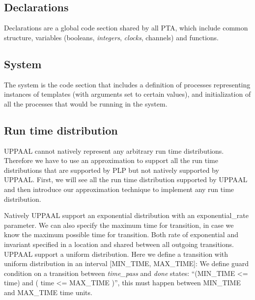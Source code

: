 \subsection{Declarations}
Declarations are a global code section shared by all PTA, which include common structure, variables (booleans, \textit{integers}, \textit{clocks}, channels) and functions.\\
\subsection{System}
The system is the code section that includes a definition of processes representing instances of templates (with arguments set to certain values), and initialization of all the processes that would be running in the system.\\
\subsection{Run time distribution}
UPPAAL cannot natively represent any arbitrary run time distributions. Therefore we have to use an approximation to support all the run time distributions that are supported by PLP but not natively supported by UPPAAL. First, we will see all the run time distribution supported by UPPAAL and then introduce our approximation technique to implement any run time distribution. 
\par Natively UPPAAL support an exponential distribution with an exponential_rate parameter. We can also specify the maximum time for transition, in case we know the maximum possible time for transition. Both rate of exponential and invariant specified in a location and shared between all outgoing transitions.  UPPAAL support a uniform distribution. Here we define a transition with uniform distribution in an interval \small[MIN_TIME, MAX_TIME\small]:  We define guard condition on a transition between \textcolor{ColorUppaalState}{\textit{time_pass}} and \textcolor{ColorUppaalState}{\textit{done}} states: “(MIN_TIME <= time) and ( time <= MAX_TIME )”, this must happen between MIN_TIME and MAX_TIME time units.
